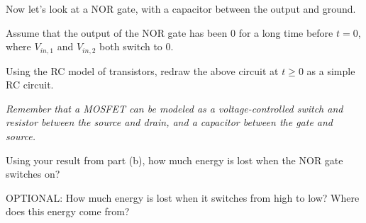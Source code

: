 Now let's look at a NOR gate, with a capacitor between the output and ground.




Assume that the output of the NOR gate has been $0$ for a long time before $t=0$, where $V_{in, 1}$ and $V_{in, 2}$ both switch to $0$.

\begin{enumerate}[resume]
\qitem Using the RC model of transistors, redraw the above circuit at $t\geq 0$ as a simple RC circuit.

\textit{Remember that a MOSFET can be modeled as a voltage-controlled switch and resistor between the source and drain, and a capacitor between the gate and source.}


\qitem Using your result from part (b), how much energy is lost when the NOR gate switches on?

\sol{
    

\[\Delta E_R = -\frac{1}{2}C_\ell V_{DD}^2\]
}

\qitem OPTIONAL: How much energy is lost when it switches from high to low? Where does this energy come from?



\end{enumerate}
